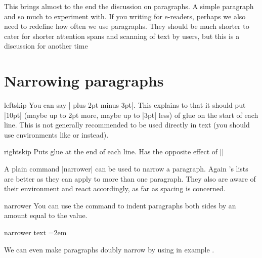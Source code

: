 This brings almost to the end the discussion on paragraphs. A simple paragraph and so much to experiment with. If you writing for e-readers, perhaps we also need to redefine how often we use paragraphs. They should be much shorter to cater for shorter attention spans and scanning of text by users, but this is a discussion for another time


\section{Narrowing paragraphs}

\begin{docCommand}{leftskip}{}
You can say |\leftskip=10pt plus 2pt minus 3pt|. This explains to \tex that it should put |10pt| (maybe up to 2pt more, maybe up to |3pt| less) of glue on the start of each line. This is not generally recommended to be used directly in text (you should use environments like  or  instead). 
\end{docCommand}

\begin{docCommand}{rightskip}{}
Puts glue at the end of each line. Has the opposite effect of |\leftskip|
\end{docCommand}

A plain \tex command |narrower| can be used to narrow a paragraph. Again \latex's lists are better as they can apply to more than one paragraph. They also are aware of their environment and react accordingly, as far as spacing is concerned.

\begin{docCommand}{narrower}{}
You can use the command  to indent paragraphs both sides by  an amount equal to the
 value.
\end{docCommand}

\begin{teXXX}
 \def\narrower{%
   \advance\leftskip\parindent
   \advance\rightskip\parindent}
\end{teXXX}

\begin{texexample}{narrower text}{}
\bgroup
\parindent=2em
\small
\onepar


\narrower

\onepar\par
\egroup
\end{texexample}

We can even make paragraphs doubly narrow by using   in example .

